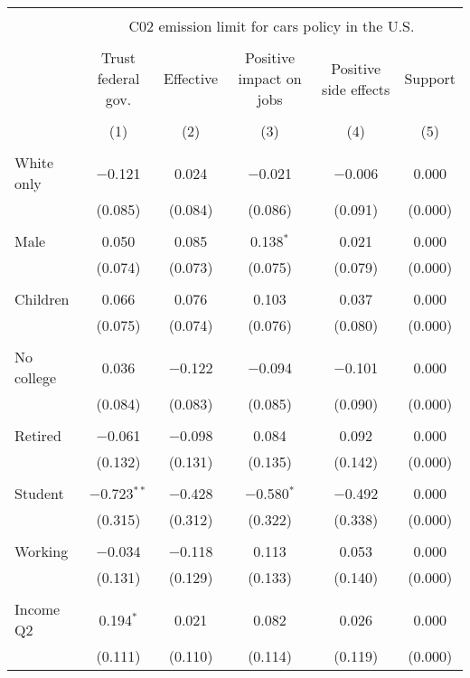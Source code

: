 
\begin{tabular}{@{\extracolsep{5pt}}lccccc} 
\\[-1.8ex]\hline 
\hline \\[-1.8ex] 
 & \multicolumn{5}{c}{C02 emission limit for cars policy in the U.S.} \\ 
\cline{2-6} 
\\[-1.8ex] & Trust federal gov. & Effective & Positive impact on jobs & Positive side effects & Support \\ 
\\[-1.8ex] & (1) & (2) & (3) & (4) & (5)\\ 
\hline \\[-1.8ex] 
 White only & $-$0.121 & 0.024 & $-$0.021 & $-$0.006 & 0.000 \\ 
  & (0.085) & (0.084) & (0.086) & (0.091) & (0.000) \\ 
  & & & & & \\ 
 Male & 0.050 & 0.085 & 0.138$^{*}$ & 0.021 & 0.000 \\ 
  & (0.074) & (0.073) & (0.075) & (0.079) & (0.000) \\ 
  & & & & & \\ 
 Children & 0.066 & 0.076 & 0.103 & 0.037 & 0.000 \\ 
  & (0.075) & (0.074) & (0.076) & (0.080) & (0.000) \\ 
  & & & & & \\ 
 No college & 0.036 & $-$0.122 & $-$0.094 & $-$0.101 & 0.000 \\ 
  & (0.084) & (0.083) & (0.085) & (0.090) & (0.000) \\ 
  & & & & & \\ 
 Retired & $-$0.061 & $-$0.098 & 0.084 & 0.092 & 0.000 \\ 
  & (0.132) & (0.131) & (0.135) & (0.142) & (0.000) \\ 
  & & & & & \\ 
 Student & $-$0.723$^{**}$ & $-$0.428 & $-$0.580$^{*}$ & $-$0.492 & 0.000 \\ 
  & (0.315) & (0.312) & (0.322) & (0.338) & (0.000) \\ 
  & & & & & \\ 
 Working & $-$0.034 & $-$0.118 & 0.113 & 0.053 & 0.000 \\ 
  & (0.131) & (0.129) & (0.133) & (0.140) & (0.000) \\ 
  & & & & & \\ 
 Income Q2 & 0.194$^{*}$ & 0.021 & 0.082 & 0.026 & 0.000 \\ 
  & (0.111) & (0.110) & (0.114) & (0.119) & (0.000) \\ 

\end{tabular}
